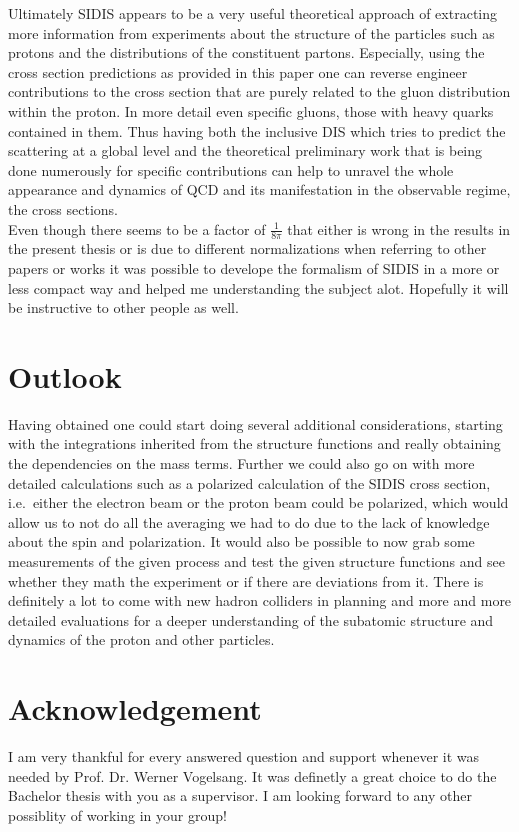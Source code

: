 Ultimately SIDIS appears to be a very useful theoretical approach of extracting more information from experiments about the structure of the particles such as protons and the distributions of the constituent partons. Especially, using the cross section predictions as provided in this paper one can reverse engineer contributions to the cross section that are purely related to the gluon distribution within the proton. In more detail even specific gluons, those with heavy quarks contained in them. Thus having both the inclusive DIS which tries to predict the scattering at a global level and the theoretical preliminary work that is being done numerously for specific contributions can help to unravel the whole appearance and dynamics of QCD and its manifestation in the observable regime, the cross sections. \\
Even though there seems to be a factor of $\frac{1}{8 \pi}$ that either is wrong in the results in the present thesis or is due to different normalizations when referring to other papers or works it was possible to develope the formalism of SIDIS in a more or less compact way and helped me understanding the subject alot. Hopefully it will be instructive to other people as well.

\section{Outlook}
Having obtained  one could start doing several additional considerations, starting with the integrations inherited from the structure functions and really obtaining the dependencies on the mass terms. Further we could also go on with more detailed calculations such as a polarized calculation of the SIDIS cross section, i.e.\ either the electron beam or the proton beam could be polarized, which would allow us to not do all the averaging we had to do due to the lack of knowledge about the spin and polarization. It would also be possible to now grab some measurements of the given process and test the given structure functions and see whether they math the experiment or if there are deviations from it. There is definitely a lot to come with new hadron colliders in planning and more and more detailed evaluations for a deeper understanding of the subatomic structure and dynamics of the proton and other particles.

\section{Acknowledgement}
I am very thankful for every answered question and support whenever it was needed by Prof. Dr. Werner Vogelsang. It was definetly a great choice to do the Bachelor thesis with you as a supervisor. I am looking forward to any other possiblity of working in your group!